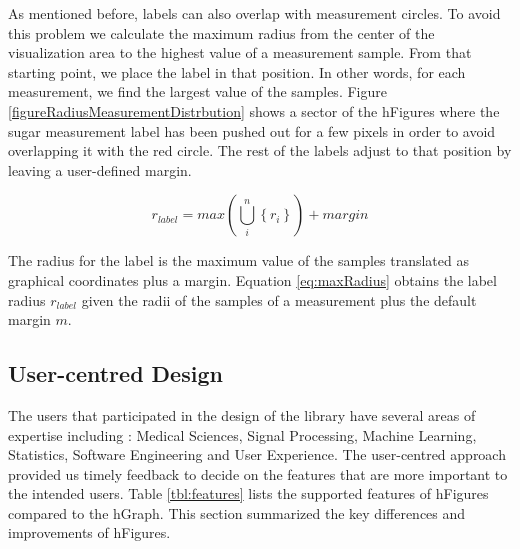 \documentclass[twocolumn]{bmcart}%
\begin{document}
As mentioned before, labels can also overlap with measurement circles. To avoid this problem we calculate the maximum radius from the center of the visualization area to the highest value of a measurement sample. From that starting point, we place the label in that position. In other words, for each measurement, we find the largest value of the samples. Figure \ref{figureRadiusMeasurementDistrbution} shows a sector of the hFigures where the sugar measurement label has been pushed out for a few pixels in order to avoid overlapping it with the red circle. The rest of the labels adjust to that position by leaving a user-defined margin.

\begin{equation} \label{eq:maxRadius}
	r_{label} = max(\bigcup_{i}^{n} \left \{ r_{i} \right \} ) + \textit{margin}
\end{equation}

The radius for the label is the maximum value of the samples translated as graphical coordinates plus a margin. Equation \ref{eq:maxRadius} obtains the label radius $r_{label}$ given the radii of the samples of a measurement plus the default margin $m$.

\subsection*{User-centred Design}



The users that participated in the design of the library have several areas of expertise including : Medical Sciences, Signal Processing, Machine Learning, Statistics, Software Engineering and User Experience.  The user-centred approach provided us timely feedback to decide on the features that are more important to the intended users. Table \ref{tbl:features} lists the supported features of hFigures compared to the hGraph. This section summarized the key differences and improvements of hFigures.
\end{document}
